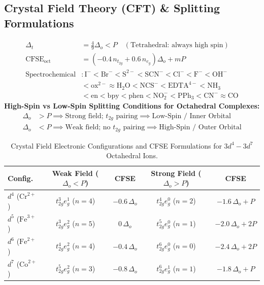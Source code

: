 \documentclass[10pt,twoside,openright]{book}
\begin{document}
\subsection{Crystal Field Theory (CFT) \& Splitting Formulations}

\begin{formulabox}
\begin{align}
  \Delta_t &= \frac{4}{9}\Delta_o < P \quad (\text{Tetrahedral: always high spin}) \\
  \text{CFSE}_{\text{oct}} &= \left(-0.4\,n_{t_{2g}} + 0.6\,n_{e_g}\right)\Delta_o + m P \\
  \text{Spectrochemical} &: \text{I}^- < \text{Br}^- < \text{S}^{2-} < \text{SCN}^- < \text{Cl}^- < \text{F}^- < \text{OH}^- \\
  &< \text{ox}^{2-} \approx \text{H}_2\text{O} < \text{NCS}^- < \text{EDTA}^{4-} < \text{NH}_3 \\
  &< \text{en} < \text{bpy} < \text{phen} < \text{NO}_2^- < \text{PPh}_3 < \text{CN}^- \approx \text{CO}
\end{align}
\textbf{High-Spin vs Low-Spin Splitting Conditions for Octahedral Complexes:}
\begin{align}
  \Delta_o &> P \implies \text{Strong field; } t_{2g}\text{ pairing} \implies \text{Low-Spin / Inner Orbital} \\
  \Delta_o &< P \implies \text{Weak field; no } t_{2g}\text{ pairing} \implies \text{High-Spin / Outer Orbital}
\end{align}
\end{formulabox}

\begin{table}[htbp]
\centering
{\fontsize{7.5pt}{9.0pt}\selectfont\setlength{\tabcolsep}{1.5pt}
\renewcommand{\arraystretch}{1.15}
\begin{tabularx}{\linewidth}{l c c c c}
\toprule
\textbf{Config.} & \textbf{Weak Field ($\Delta_o < P$)} & \textbf{CFSE} & \textbf{Strong Field ($\Delta_o > P$)} & \textbf{CFSE} \\
\midrule
$d^4$ ($\text{Cr}^{2+}$) & $t_{2g}^3 e_g^1$ ($n=4$) & $-0.6\,\Delta_o$ & $t_{2g}^4 e_g^0$ ($n=2$) & $-1.6\,\Delta_o + P$ \\
$d^5$ ($\text{Fe}^{3+}$) & $t_{2g}^3 e_g^2$ ($n=5$) & $0\,\Delta_o$ & $t_{2g}^5 e_g^0$ ($n=1$) & $-2.0\,\Delta_o + 2P$ \\
$d^6$ ($\text{Fe}^{2+}$) & $t_{2g}^4 e_g^2$ ($n=4$) & $-0.4\,\Delta_o$ & $t_{2g}^6 e_g^0$ ($n=0$) & $-2.4\,\Delta_o + 2P$ \\
$d^7$ ($\text{Co}^{2+}$) & $t_{2g}^5 e_g^2$ ($n=3$) & $-0.8\,\Delta_o$ & $t_{2g}^6 e_g^1$ ($n=1$) & $-1.8\,\Delta_o + P$ \\
\bottomrule
\end{tabularx}}
\caption{Crystal Field Electronic Configurations and CFSE Formulations for $3d^4 - 3d^7$ Octahedral Ions.}
\end{table}
\end{document}
